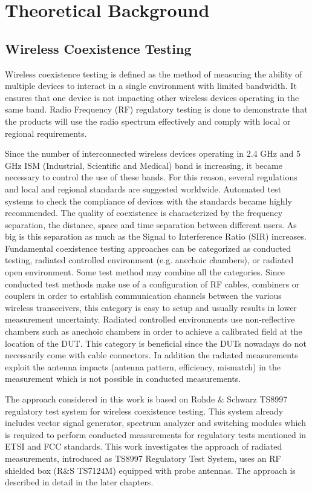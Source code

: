 \chapter{Theoretical Background}
\section{Wireless Coexistence Testing}

Wireless coexistence testing is defined as the method of measuring the ability of multiple devices to interact in a single environment with limited bandwidth. It ensures that one device is not impacting other wireless devices operating in the same band. Radio Frequency (RF) regulatory testing is done to demonstrate that the products will use the radio spectrum effectively and comply with local or regional requirements. 

Since the number of interconnected wireless devices operating in 2.4 GHz and 5 GHz ISM (Industrial, Scientific and Medical) band is increasing, it became necessary to control the use of these bands. For this reason, several regulations and local and regional standards are suggested worldwide. Automated test systems to check the compliance of devices with the standards became highly recommended. The quality of coexistence is characterized by the frequency separation, the distance, space and time separation between different users. As big is this separation as much as the Signal to Interference Ratio (SIR) increases. Fundamental coexistence testing approaches can be categorized as conducted testing, radiated controlled environment (e.g. anechoic chambers), or radiated open environment. Some test method may combine all the categories.
Since conducted test methods make use of a configuration of RF cables, combiners or couplers in order to establish communication channels between the various wireless transceivers, this category is easy to setup and usually results in lower measurement uncertainty.
Radiated controlled environments use non-reflective chambers such as anechoic chambers in order to achieve a calibrated field at the location of the DUT. This category is beneficial since the DUTs nowadays do not necessarily come with cable connectors. In addition the radiated measurements exploit the antenna impacts (antenna pattern, efficiency, mismatch) in the measurement which is not possible in conducted measurements.

The approach considered in this work is based on Rohde $\&$ Schwarz TS8997 regulatory test system for wireless coexistence testing. This system already includes vector signal generator, spectrum analyzer and switching modules which is required to perform conducted measurements for regulatory tests mentioned in ETSI and FCC standards. This work investigates the approach of radiated measurements, introduced as TS8997 Regulatory Test System,  uses an RF shielded box (R$\&$S TS7124M) equipped with probe antennas. The approach is described in detail in the later chapters.





